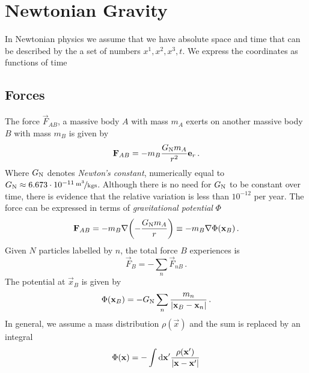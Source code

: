 \chapter{Newtonian Gravity}
In Newtonian physics we assume that we have absolute space and time that can be described by the a set of numbers $x^1,x^2,x^3,t$. We express the coordinates as functions of time
\section{Forces}
The force $\vec{F}_{AB}$, a massive body $A$ with mass $m_A$ exerts on another massive body $B$ with mass $m_B$ is given by
\begin{equation}
    \vec{F}_{AB}=-m_B\frac{G\textsubscript{N}m_A}{r^2}\vec{e}_r\, .
\end{equation}
Where $G\textsubscript{N}$ denotes \emph{Newton's constant}, numerically equal
to $G\textsubscript{N}\approx \unitfrac[6.673\cdot 10^{-11}]{m^3}{kgs}$. Although there is no need for $G\textsubscript{N}$ to be constant over time, there is evidence that the relative variation is less than $10^{-12}$ per year. The force can be expressed in terms of \emph{gravitational potential} $\Phi$
\begin{equation}
    \vec{F}_{AB}=-m_B\nabla\left(-\frac{G\textsubscript{N}m_A}{r}\right)\equiv -m_B\nabla\Phi(\vec{x}_B)\, .
\end{equation}
Given $N$ particles labelled by $n$, the total force $B$ experiences is
\begin{equation}
    \vec{F}_{B}=-\sum_n \vec{F}_{nB}\, .
\end{equation}
The potential at $\vec{x}_B$ is given by
\begin{equation}
    \Phi(\vec{x}_B)=-G\textsubscript{N}\sum_n\frac{m_n}{|\vec{x}_B-\vec{x}_n|}\, .
\end{equation}
In general, we assume a mass distribution $\rho(\vec{x})$ and the sum is replaced by an integral
\begin{equation}
    \Phi(\vec{x})=-\int\dif{\vec{x}^{\prime}}\frac{\rho(\vec{x}^{\prime})}{|\vec{x}-\vec{x}^{\prime}|}
\end{equation}
